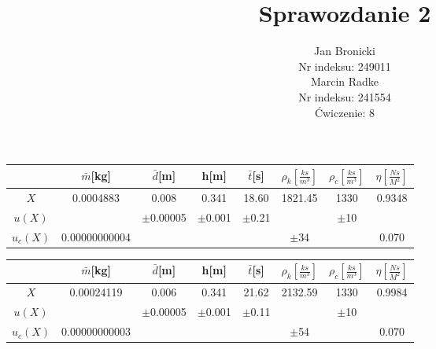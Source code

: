 \documentclass{article}
\title{Sprawozdanie 2}
\author{Jan Bronicki \\
Nr indeksu: 249011\\
Marcin Radke\\
Nr indeksu: 241554\\
Ćwiczenie: 8}
\date{}
\begin{document}
\maketitle
\renewcommand{\arraystretch}{1.3}
\begin{tabular}{|c|c|c|c|c|c|c|c|}
    \hline
    &$\bar{m}$[kg]&$\bar{d}$[m]&h[m]&$\bar{t}$[s]&$\rho_{k}\left[\frac{ks}{m^{3}}\right]$&$\rho_{c}$$\left[\frac{ks}{m^{3}}\right]$&$\eta\left[\frac{Ns}{M^{2}}\right]$\\
    \hline 
    $X$ &0.0004883&0.008&0.341&18.60&1821.45&1330&0.9348\\\hline
    $u(X)$&\cellcolor{gray}&$\pm$0.00005&$\pm$0.001&$\pm$0.21&\cellcolor{gray}&$\pm$10&\cellcolor{gray}    \\\hline
    $u_{c}(X)$&0.00000000004&\cellcolor{gray}&\cellcolor{gray}&\cellcolor{gray}&$\pm$34&\cellcolor{gray}&0.070\\\hline
\end{tabular}

\begin{tabular}{|c|c|c|c|c|c|c|c|}
    \hline
    \cellcolor{gray!50}&\cellcolor{gray!50}$\bar{m}$[kg]&\cellcolor{gray!50}$\bar{d}$[m]&\cellcolor{gray!50}h[m]&\cellcolor{gray!50}$\bar{t}$[s]&\cellcolor{gray!50}$\rho_{k}\left[\frac{ks}{m^{3}}\right]$&\cellcolor{gray!50}$\rho_{c}$$\left[\frac{ks}{m^{3}}\right]$&\cellcolor{gray!50}$\eta\left[\frac{Ns}{M^{2}}\right]$\\
    \hline 
    \cellcolor{gray!50}$X$ &\cellcolor{gray!50}0.00024119&\cellcolor{gray!50}0.006&\cellcolor{gray!50}0.341&\cellcolor{gray!50}21.62&\cellcolor{gray!50}2132.59&\cellcolor{gray!50}1330&\cellcolor{gray!50}0.9984\\\hline
    \cellcolor{gray!50}$u(X)$&\cellcolor{gray}&\cellcolor{gray!50}$\pm$0.00005&\cellcolor{gray!50}$\pm$0.001&\cellcolor{gray!50}$\pm$0.11&\cellcolor{gray}&\cellcolor{gray!50}$\pm$10&\cellcolor{gray}    \\\hline
    \cellcolor{gray!50}$u_{c}(X)$&\cellcolor{gray!50}0.00000000003&\cellcolor{gray}&\cellcolor{gray}&\cellcolor{gray}&\cellcolor{gray!50}$\pm$54&\cellcolor{gray}&\cellcolor{gray!50}0.070\\\hline
\end{tabular}
\end{document}
